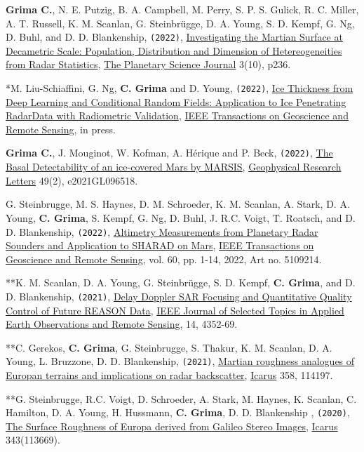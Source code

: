 \begin{etaremune}
\item
  \textbf{Grima C.}, N. E. Putzig, B. A. Campbell, M. Perry, S. P. S. Gulick, R. C. Miller, A. T. Russell, K. M. Scanlan, G. Steinbrügge, D. A. Young, S. D. Kempf, G. Ng, D. Buhl, and D. D. Blankenship, \texttt{(2022)}, \href{https://doi.org/10.3847/PSJ/ac9277}{Investigating the Martian Surface at Decametric Scale: Population, Distribution and Dimension of Hetereogeneities from Radar Statistics}, \ul{The Planetary Science Journal} 3(10), p236.
\item
  *M. Liu-Schiaffini, G. Ng, \textbf{C. Grima} and D. Young, \texttt{(2022)}, \href{https://ieeexplore.ieee.org/document/9916288}{Ice Thickness from Deep Learning and Conditional Random Fields: Application to Ice Penetrating RadarData with Radiometric Validation}, \ul{IEEE Transactions on Geoscience and Remote Sensing}, in press.
\item
  \textbf{Grima C.}, J. Mouginot, W. Kofman, A. Hérique and P. Beck, \texttt{(2022)}, \href{https://doi.org/10.1029/2021GL096518}{The Basal Detectability of an ice-covered Mars by MARSIS}, \ul{Geophysical Research Letters} 49(2), e2021GL096518.
\item
  G. Steinbrugge, M. S. Haynes, D. M. Schroeder, K. M. Scanlan, A. Stark, D. A. Young, \textbf{C. Grima}, S. Kempf, G. Ng, D. Buhl, J. R.C. Voigt, T. Roatsch, and D. D. Blankenship, \texttt{(2022)}, \href{https://doi.org/10.1109/TGRS.2021.3134638}{Altimetry Measurements from Planetary Radar Sounders and Application to SHARAD on Mars}, \ul{IEEE Transactions on Geoscience and Remote Sensing}, vol. 60, pp. 1-14, 2022, Art no. 5109214.
\item
  **K. M. Scanlan, D. A. Young, G. Steinbrügge, S. D. Kempf, \textbf{C. Grima}, and D. D. Blankenship, \texttt{(2021)}, \href{https://ieeexplore.ieee.org/document/9399772?source=authoralert}{Delay Doppler SAR Focusing and Quantitative Quality Control of Future REASON Data}, \ul{IEEE Journal of Selected Topics in Applied Earth Observations and Remote Sensing}, 14, 4352-69.
\item
  **C. Gerekos, \textbf{C. Grima}, G. Steinbrugge, S. Thakur, K. M. Scanlan, D. A. Young, L. Bruzzone, D. D. Blankenship, \texttt{(2021)}, \href{https://doi.org/10.1016/j.icarus.2020.114197}{Martian roughness analogues of Europan terrains and implications on radar backscatter}, \ul{Icarus} 358, 114197.
\item
  **G. Steinbrugge, R.C. Voigt, D. Schroeder, A. Stark, M. Haynes, K. Scanlan, C. Hamilton, D. A. Young, H. Hussmann, \textbf{C. Grima}, D. D. Blankenship , \texttt{(2020)}, \href{https://www.sciencedirect.com/science/article/abs/pii/S0019103519301526}{The Surface Roughness of Europa derived from Galileo Stereo Images}, \ul{Icarus} 343(113669).

\end{etaremune}
